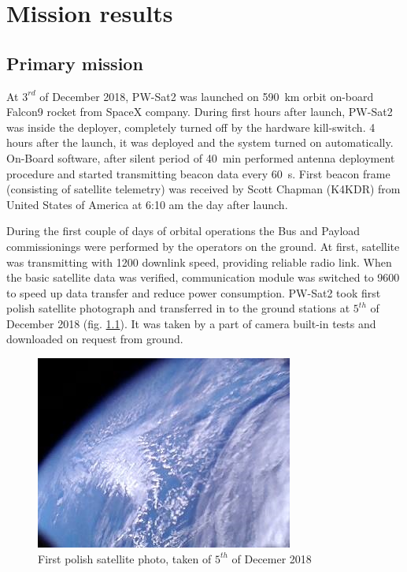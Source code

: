 \chapter{Mission results}

\section{Primary mission}
At $3^{rd}$ of December 2018, PW-Sat2 was launched on \SI{590}{\kilo\meter} orbit on-board Falcon9 rocket from SpaceX company. During first hours after launch, PW-Sat2 was inside the deployer, completely turned off by the hardware kill-switch. 4 hours after the launch, it was deployed and the system turned on automatically. On-Board software, after silent period of \SI{40}{\minute} performed antenna deployment procedure and started transmitting beacon data every \SI{60}{\second}. First beacon frame (consisting of satellite telemetry) was received by Scott Chapman (K4KDR) from United States of America at 6:10 am the day after launch. 

During the first couple of days of orbital operations the Bus and Payload commissionings were performed by the operators on the ground. At first, satellite was transmitting with \SI{1200}{\bps} downlink speed, providing reliable radio link. When the basic satellite data was verified, communication module was switched to \SI{9600}{\bps} to speed up data transfer and reduce power consumption. PW-Sat2 took first polish satellite photograph and transferred in to the ground stations at $5^{th}$ of December 2018 (fig. \ref{sat_photo}). It was taken by a part of camera built-in tests and downloaded on request from ground.

\begin{figure}[H]
    \centering
    \includegraphics[width=0.5\paperwidth]{img/9/sat_photo.jpg}
    \caption{First polish satellite photo, taken of $5^{th}$ of Decemer 2018}
    \label{sat_photo}
\end{figure}

